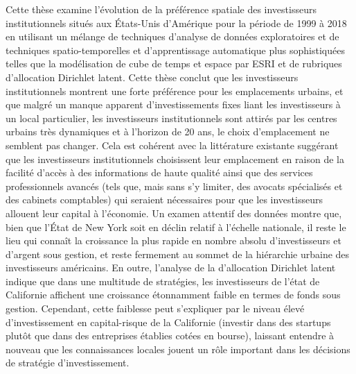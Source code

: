 \documentclass[12pt,letterpaper]{book}
\numberwithin{figure}{chapter}
\newenvironment{preliminary}%
{\pagestyle{plain}\pagenumbering{roman}}%
{\pagenumbering{arabic}}
\begin{document}
\begin{preliminary}
\begin{spacing}{2}
			Cette th\`{e}se examine l'\'{e}volution de la pr\'{e}f\'{e}rence spatiale des investisseurs institutionnels situ\'{e}s aux \'{E}tats-Unis d'Am\'{e}rique pour la p\'{e}riode de 1999 \`{a} 2018 en utilisant un m\'{e}lange de techniques d'analyse de donn\'{e}es exploratoires et de techniques spatio-temporelles et d'apprentissage automatique plus sophistiqu\'{e}es telles que la mod\'{e}lisation de cube de temps et espace par ESRI et de rubriques d'allocation Dirichlet latent. Cette th\`{e}se conclut que les investisseurs institutionnels montrent une forte pr\'{e}f\'{e}rence pour les emplacements urbains, et que malgr\'{e} un manque apparent d'investissements fixes liant les investisseurs \`{a} un local particulier, les investisseurs institutionnels sont attir\'{e}s par les centres urbains tr\`{e}s dynamiques et \`{a} l'horizon de 20 ans, le choix d'emplacement ne semblent pas changer. Cela est coh\'{e}rent avec la litt\'{e}rature existante sugg\'{e}rant que les investisseurs institutionnels choisissent leur emplacement en raison de la facilit\'{e} d'acc\`{e}s \`{a} des informations de haute qualit\'{e} ainsi que des services professionnels avanc\'{e}s (tels que, mais sans s'y limiter, des avocats sp\'{e}cialis\'{e}s et des cabinets comptables) qui seraient n\'{e}cessaires pour que les investisseurs allouent leur capital \`{a} l'\'{e}conomie. Un examen attentif des donn\'{e}es montre que, bien que l'\'{E}tat de New York soit en d\'{e}clin relatif \`{a} l'\'{e}chelle nationale, il reste le lieu qui connaît la croissance la plus rapide en nombre absolu d'investisseurs et d'argent sous gestion, et reste fermement au sommet de la hi\'{e}rarchie urbaine des investisseurs am\'{e}ricains. En outre, l'analyse de la d'allocation Dirichlet latent indique que dans une multitude de strat\'{e}gies, les investisseurs de l'\'{e}tat de Californie affichent une croissance \'{e}tonnamment faible en termes de fonds sous gestion. Cependant, cette faiblesse peut s'expliquer par le niveau \'{e}lev\'{e} d'investissement en capital-risque de la Californie (investir dans des startups plutôt que dans des entreprises \'{e}tablies cot\'{e}es en bourse), laissant entendre \`{a} nouveau que les connaissances locales jouent un r\^{o}le important dans les d\'{e}cisions de strat\'{e}gie d'investissement.
			
			
		\end{spacing}
		
		\newpage		
		
		\begin{spacing}{1.5}
			

\end{spacing}
\end{preliminary}
\end{document}
